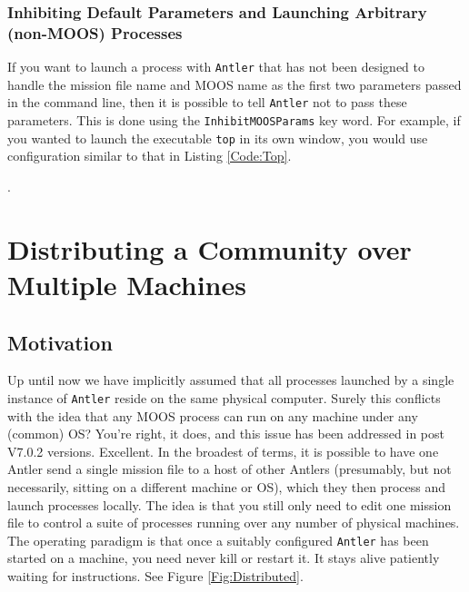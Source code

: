 \documentclass[a4paper,10pt]{article}
\newcommand{\Code}[1]{\texttt{#1} }
\newcommand{\code}[1]{\Code{#1} }
\begin{document}
\subsubsection{Inhibiting Default Parameters and Launching Arbitrary (non-MOOS) Processes}\label{Sec:Inhibit}

If you want to launch a process with \code{Antler} that has not been designed to handle the mission file name and MOOS name as the first two parameters passed in the command line, then it is possible to tell \code{Antler} not to pass these parameters. This is done using the \code{InhibitMOOSParams}  key word. For example, if you wanted to launch the executable \code{top} in its own window, you would use configuration similar to that in Listing \ref{Code:Top}.

.



\section{Distributing  a Community over Multiple Machines}

\subsection{Motivation}

Up until now we have implicitly assumed that all processes launched by a single instance of \code{Antler} reside on the same physical computer. Surely this conflicts with the idea that any MOOS process can run on any machine under any (common) OS? You're right, it does, and this issue has been addressed in post V7.0.2 versions. Excellent. In the broadest of terms, it is possible to have one Antler send a single mission file to a host of other Antlers (presumably, but not necessarily, sitting on a different machine or OS), which they then process and launch processes locally. The idea is that you still only need to edit one mission file to control a suite of processes running over any number of physical machines. The operating paradigm is that once a suitably configured \code{Antler} has been started on a machine, you need never kill or restart it. It stays alive patiently waiting for instructions. See Figure \ref{Fig:Distributed}.
\end{document}
